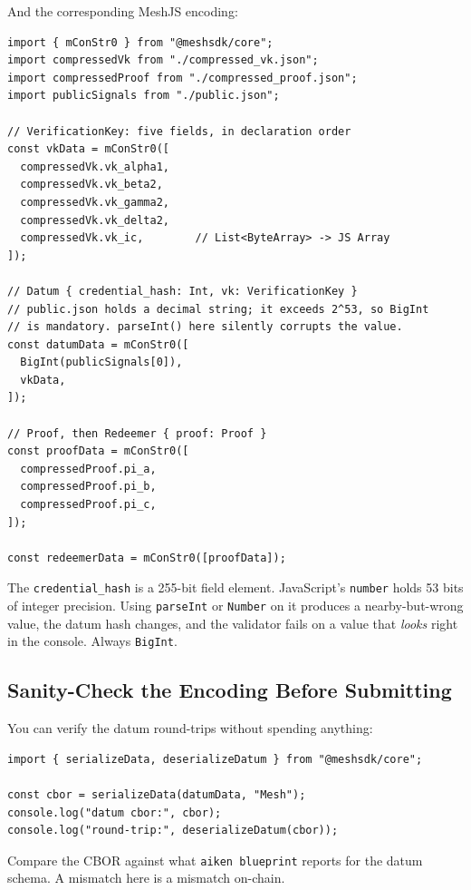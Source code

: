 And the corresponding MeshJS encoding:

\begin{verbatim}
import { mConStr0 } from "@meshsdk/core";
import compressedVk from "./compressed_vk.json";
import compressedProof from "./compressed_proof.json";
import publicSignals from "./public.json";

// VerificationKey: five fields, in declaration order
const vkData = mConStr0([
  compressedVk.vk_alpha1,
  compressedVk.vk_beta2,
  compressedVk.vk_gamma2,
  compressedVk.vk_delta2,
  compressedVk.vk_ic,        // List<ByteArray> -> JS Array
]);

// Datum { credential_hash: Int, vk: VerificationKey }
// public.json holds a decimal string; it exceeds 2^53, so BigInt
// is mandatory. parseInt() here silently corrupts the value.
const datumData = mConStr0([
  BigInt(publicSignals[0]),
  vkData,
]);

// Proof, then Redeemer { proof: Proof }
const proofData = mConStr0([
  compressedProof.pi_a,
  compressedProof.pi_b,
  compressedProof.pi_c,
]);

const redeemerData = mConStr0([proofData]);
\end{verbatim}

\begin{remark}
The \texttt{credential\_hash} is a 255-bit field element. JavaScript's
\texttt{number} holds 53 bits of integer precision. Using \texttt{parseInt} or
\texttt{Number} on it produces a nearby-but-wrong value, the datum hash changes,
and the validator fails on a value that \emph{looks} right in the console.
Always \texttt{BigInt}.
\end{remark}

\subsection*{Sanity-Check the Encoding Before Submitting}

You can verify the datum round-trips without spending anything:

\begin{verbatim}
import { serializeData, deserializeDatum } from "@meshsdk/core";

const cbor = serializeData(datumData, "Mesh");
console.log("datum cbor:", cbor);
console.log("round-trip:", deserializeDatum(cbor));
\end{verbatim}

Compare the CBOR against what \texttt{aiken blueprint} reports for the datum
schema. A mismatch here is a mismatch on-chain.

